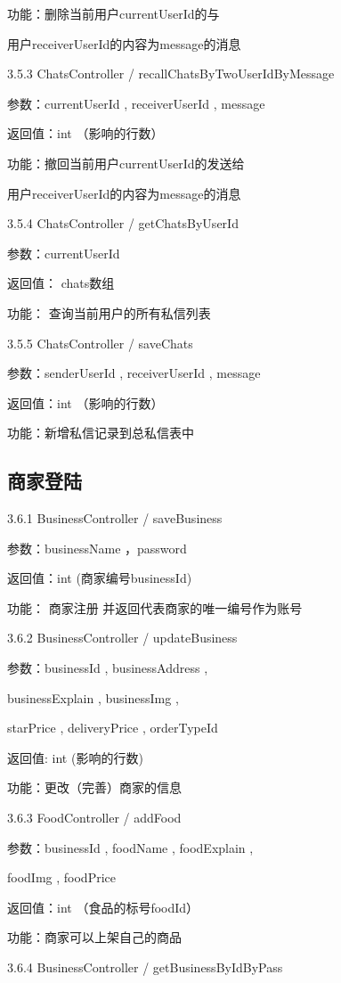     功能：删除当前用户currentUserId的与

    用户receiverUserId的内容为message的消息

    3.5.3 ChatsController / recallChatsByTwoUserIdByMessage

    参数：currentUserId , receiverUserId , message

    返回值：int （影响的行数）

    功能：撤回当前用户currentUserId的发送给

    用户receiverUserId的内容为message的消息

    3.5.4 ChatsController / getChatsByUserId

    参数：currentUserId

    返回值： chats数组

    功能： 查询当前用户的所有私信列表

    3.5.5 ChatsController / saveChats

    参数：senderUserId , receiverUserId , message

    返回值：int （影响的行数）

    功能：新增私信记录到总私信表中
    \subsection{商家登陆}

    3.6.1 BusinessController / saveBusiness

    参数：businessName ，password

    返回值：int (商家编号businessId)

    功能： 商家注册 并返回代表商家的唯一编号作为账号

    3.6.2 BusinessController / updateBusiness

    参数：businessId , businessAddress ,

    businessExplain , businessImg ,

    starPrice , deliveryPrice , orderTypeId

    返回值: int (影响的行数)

    功能：更改（完善）商家的信息

    3.6.3 FoodController / addFood

    参数：businessId , foodName , foodExplain ,

    foodImg , foodPrice

    返回值：int （食品的标号foodId）

    功能：商家可以上架自己的商品

    3.6.4 BusinessController / getBusinessByIdByPass

